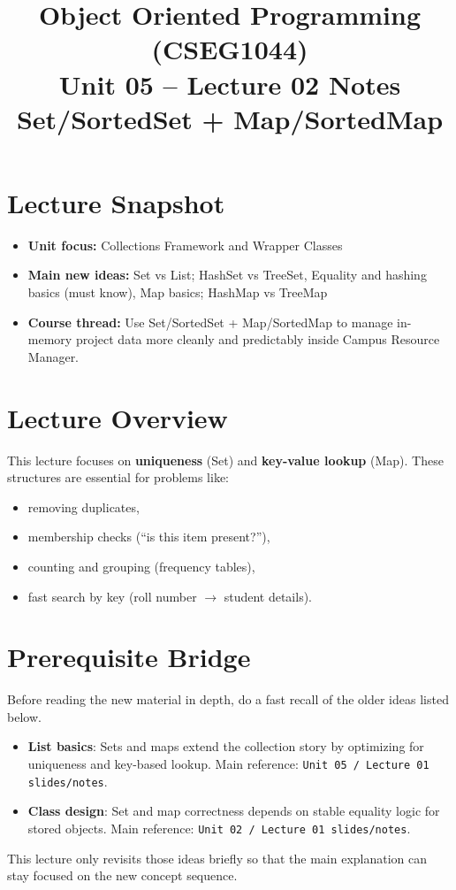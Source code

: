 \documentclass[11pt]{article}
\title{Object Oriented Programming (CSEG1044)\\Unit 05 -- Lecture 02 Notes\\Set/SortedSet + Map/SortedMap}
\begin{document}
\maketitle
\tableofcontents

\section{Lecture Snapshot}
\begin{itemize}
  \item \textbf{Unit focus:} Collections Framework and Wrapper Classes
  \item \textbf{Main new ideas:} Set vs List; HashSet vs TreeSet, Equality and hashing basics (must know), Map basics; HashMap vs TreeMap
  \item \textbf{Course thread:} Use Set/SortedSet + Map/SortedMap to manage in-memory project data more cleanly and predictably inside Campus Resource Manager.
\end{itemize}
\notesources{\OOPSUnitVSources}

\section{Lecture Overview}
This lecture focuses on \textbf{uniqueness} (Set) and \textbf{key-value lookup} (Map).
These structures are essential for problems like:
\begin{itemize}
  \item removing duplicates,
  \item membership checks (``is this item present?''),
  \item counting and grouping (frequency tables),
  \item fast search by key (roll number $\rightarrow$ student details).
\end{itemize}
\notesources{\OOPSUnitVSources}

\section{Prerequisite Bridge}
Before reading the new material in depth, do a fast recall of the older ideas listed below.
\begin{itemize}
  \item \textbf{List basics}: Sets and maps extend the collection story by optimizing for uniqueness and key-based lookup. Main reference: \texttt{Unit 05 / Lecture 01 slides/notes}.
  \item \textbf{Class design}: Set and map correctness depends on stable equality logic for stored objects. Main reference: \texttt{Unit 02 / Lecture 01 slides/notes}.
\end{itemize}
This lecture only revisits those ideas briefly so that the main explanation can stay focused on the new concept sequence.
\notesources{\OOPSUnitVSources}
\end{document}
